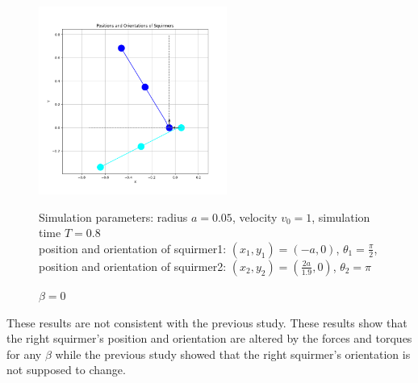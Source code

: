 \documentclass{article}
\begin{document}
\begin{figure}[H]
\begin{minipage}{0.49\textwidth}
        \caption{\footnotesize $\beta = 3$}
    \end{minipage}
    \includegraphics[width=0.55\textwidth]{graphs/simulations/sim_sq_sq/beta0/pi_.png}
    \caption{\footnotesize $\beta = 0$}
    Simulation parameters: radius $a=0.05$, velocity $v_0=1$, simulation time $T=0.8$\\
        position and orientation of squirmer1: $(x_1,y_1)=(-a,0)$, $\theta_1=\frac{\pi}{2}$,\\
        position and orientation of squirmer2: $(x_2,y_2)=(\frac{2a}{1.9},0)$, $\theta_2=\pi$
\end{figure}
These results are not consistent with the previous study\cite{Stark}. These results show that the right squirmer's position
and orientation are altered by the forces and torques for any $\beta$ while the previous study showed that the right squirmer's
orientation is not supposed to change.
\end{document}
